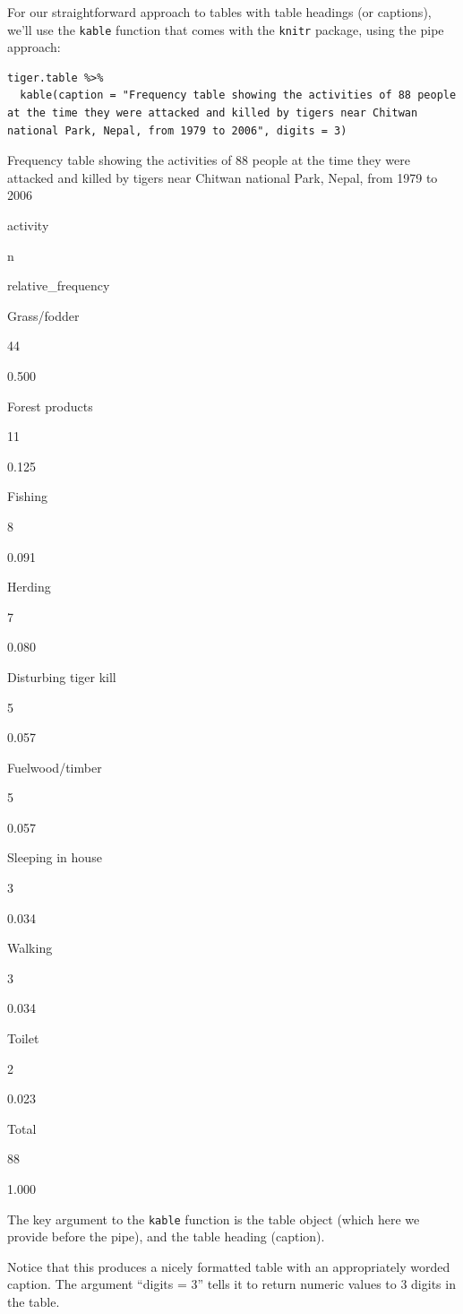 \documentclass[
]{book}
\begin{document}
For our straightforward approach to tables with table headings (or captions), we'll use the \texttt{kable} function that comes with the \texttt{knitr} package, using the pipe approach:

\begin{verbatim}
tiger.table %>%
  kable(caption = "Frequency table showing the activities of 88 people at the time they were attacked and killed by tigers near Chitwan national Park, Nepal, from 1979 to 2006", digits = 3)
\end{verbatim}

\label{tab:tigerfreqtable}Frequency table showing the activities of 88 people at the time they were attacked and killed by tigers near Chitwan national Park, Nepal, from 1979 to 2006

activity

n

relative\_frequency

Grass/fodder

44

0.500

Forest products

11

0.125

Fishing

8

0.091

Herding

7

0.080

Disturbing tiger kill

5

0.057

Fuelwood/timber

5

0.057

Sleeping in house

3

0.034

Walking

3

0.034

Toilet

2

0.023

Total

88

1.000

The key argument to the \texttt{kable} function is the table object (which here we provide before the pipe), and the table heading (caption).

Notice that this produces a nicely formatted table with an appropriately worded caption. The argument ``digits = 3'' tells it to return numeric values to 3 digits in the table.
\end{document}
